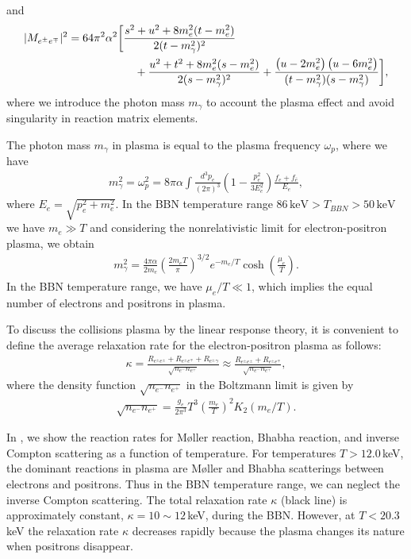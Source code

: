 and
\begin{align}
|M_{e^\pm e^\mp}|^{2}=64\pi^{2}\alpha^{2}
\bigg[&\frac{s^{2}+u^{2}+8m_e^{2}(t-m_e^{2})}{2(t-m^2_{\gamma})^{2}}\notag\\
&\quad+\frac{u^{2}+t^{2}+8m_e^{2}
(s-m_e^{2})}{2(s-m^2_{\gamma})^{2}}  +   \frac{\left({u}-2m_e^{2}\right)\left({u}-6m_e^{2}\right)}
   {(t-m^2_{\gamma})(s-m^2_{\gamma})} \bigg],
\label{M_fi_b}
\end{align}
where we introduce the photon mass $m_\gamma$ to account the plasma effect and avoid singularity in reaction matrix elements. 

The photon mass $m_\gamma$ in plasma is equal to the plasma frequency $\omega_p$, where we have~\cite{Kislinger:1975uy}
\begin{align}
m^2_\gamma=\omega^2_{p}=8\pi\alpha\int\frac{d^3p_e}{(2\pi)^3}\left(1-\frac{p_e^2}{3E_e^2}\right)\frac{f_e+f_{\bar e}}{E_e},
\end{align}
where $E_e=\sqrt{p_e^2+m^2_e}$. In the BBN temperature range $86\,\mathrm{keV}>T_{BBN}>50\,\mathrm{keV}$ we have $m_e\gg T$ and considering the nonrelativistic limit for electron-positron plasma, we obtain
\begin{align}
m^2_\gamma=\frac{4\pi\alpha}{2m_e}\left(\frac{2m_eT}{\pi}\right)^{3/2}e^{-m_e/T}\cosh\left(\frac{\mu_e}{T}\right).
\end{align}
In the BBN temperature range, we have $\mu_e/T\ll1$, which implies the equal number of electrons and positrons in plasma.

To discuss the collisions plasma by the linear response theory, it is convenient to define the average relaxation rate for the electron-positron plasma as follows:
\begin{align}\label{Kappa}
\kappa=\frac{R_{e^\pm e^\pm}+R_{e^\pm e^\mp}+R_{e^\pm\gamma}}{\sqrt{n_{e^-}n_{e^+}}}\approx\frac{R_{e^\pm e^\pm}+R_{e^\pm e^\mp}}{\sqrt{n_{e^-}n_{e^+}}},
\end{align}
where the density function ${\sqrt{n_{e^-}n_{e^+}}}$ in the Boltzmann limit is given by
\begin{align}
{\sqrt{n_{e^-}n_{e^+}}}=\frac{g_e}{2\pi^3}T^3\left(\frac{m_e}{T}\right)^2K_2(m_e/T).
\end{align}

In , we show the reaction rates for M{\o}ller reaction, Bhabha reaction, and inverse Compton scattering as a function of temperature. For temperatures $T>12.0$\,keV, the dominant reactions in plasma are M{\o}ller and Bhabha scatterings between electrons and positrons. Thus in the BBN temperature range, we can neglect the inverse Compton scattering. The total relaxation rate $\kappa$ (black line) is approximately constant, $\kappa=10\sim12$\,keV, during the BBN. However, at $T<20.3$\,keV the relaxation rate $\kappa$ decreases rapidly because the plasma changes its nature when positrons disappear.

